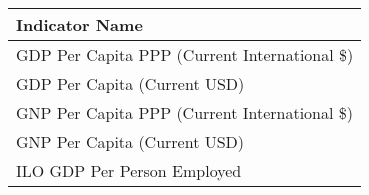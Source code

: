 \begin{tabular}{l}
\toprule
                              Indicator Name \\
\midrule
GDP Per Capita PPP (Current International \$) \\
GDP Per Capita (Current USD) \\
GNP Per Capita PPP (Current International \$) \\
GNP Per Capita (Current USD) \\
ILO GDP Per Person Employed \\
\bottomrule
\end{tabular}
